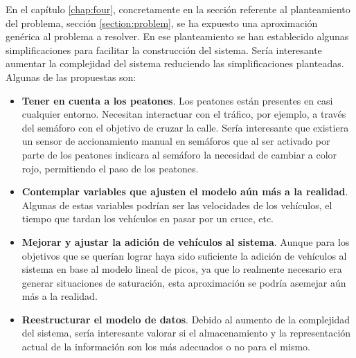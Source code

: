 En el capítulo \ref{chap:four}, concretamente en la sección referente al planteamiento del problema, sección \ref{section:problem}, se ha expuesto una aproximación genérica al problema a resolver. En ese planteamiento se han establecido algunas simplificaciones para facilitar la construcción del sistema. Sería interesante aumentar la complejidad del sistema reduciendo las simplificaciones planteadas. Algunas de las propuestas son:
\begin{itemize}
    \item \textbf{Tener en cuenta a los peatones}. Los peatones están presentes en casi cualquier entorno. Necesitan interactuar con el tráfico, por ejemplo, a través del semáforo con el objetivo de cruzar la calle. Sería interesante que existiera un sensor de accionamiento manual en semáforos que al ser activado por parte de los peatones indicara al semáforo la necesidad de cambiar a color rojo, permitiendo el paso de  los peatones.
    \item \textbf{Contemplar variables que ajusten el modelo aún más a la realidad}. Algunas de estas variables podrían ser las velocidades de los vehículos, el tiempo que tardan los vehículos en pasar por un cruce, etc.
    \item \textbf{Mejorar y ajustar la adición de vehículos al sistema}. Aunque para los objetivos que se querían lograr haya sido suficiente la adición de vehículos al sistema en base al modelo lineal de picos, ya que lo realmente necesario era generar situaciones de saturación, esta aproximación se podría asemejar aún más a la realidad.
    \item \textbf{Reestructurar el modelo de datos}. Debido al aumento de la complejidad del sistema, sería interesante valorar si el almacenamiento y la representación actual de la información son los más adecuados o no para el mismo. 
\end{itemize}